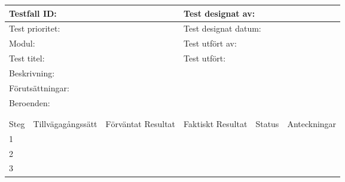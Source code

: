 \documentclass[10pt]{article}
\begin{document}
\begin{tabular}{| p{1cm}|  p{3cm} | p{3cm}| p{3cm}| p{2cm}| p{3cm}|}
  \hline
	\multicolumn{3}{|l|}{Testfall ID:}&\multicolumn{3}{|l|}{Test designat av:}\\
	\hline
	\multicolumn{3}{|l|}{Test prioritet:}&\multicolumn{3}{|l|}{Test designat datum:}\\
	\hline
	\multicolumn{3}{|l|}{Modul:}&\multicolumn{3}{|l|}{Test utfört av:}\\
	\hline
	\multicolumn{3}{|l|}{Test titel:}&\multicolumn{3}{|l|}{Test utfört:}\\
	\hline
	\multicolumn{6}{|p{\textwidth}|}{Beskrivning:}\\
	\hline
	\multicolumn{6}{|p{\textwidth}|}{Förutsättningar:}\\
	\hline
	\multicolumn{6}{|p{\textwidth}|}{Beroenden:}\\

	\hline
	\multicolumn{6}{|l|}{}\\
	\multicolumn{6}{|l|}{}\\
      	\hline
	Steg&Tillvägagångssätt&Förväntat Resultat&Faktiskt Resultat&Status&Anteckningar \\
	\hline
	1&&&&&\\
      	\hline
	2&&&&&\\
      	\hline
	3&&&&&\\
      	\hline
\end{tabular}
\end{document}

